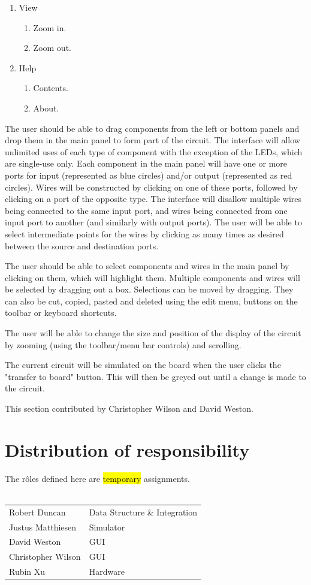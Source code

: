 \documentclass[12pt, a4paper, oneside,titlepage]{article}
\begin{document}
\begin{enumerate}
\begin{enumerate}
												 \item View
												 												\begin{enumerate}
												\item Zoom in.
												\item Zoom out.
												\end{enumerate}	
												
												 \item Help
												 												\begin{enumerate}
												\item Contents.
												\item About.
												\end{enumerate}	
												\end{enumerate}

\end{enumerate}
The user should be able to drag components from the left or bottom panels and drop them in the main panel to form part of the circuit. The interface will allow unlimited uses of each type of component with the exception of the LEDs, which are single-use only. Each component in the main panel will have one or more ports for input (represented as blue circles) and/or output (represented as red circles). Wires will be constructed by clicking on one of these ports, followed by clicking on a port of the opposite type. The interface will disallow multiple wires being connected to the same input port, and wires being connected from one input port to another (and similarly with output ports). The user will be able to select intermediate points for the wires by clicking as many times as desired between the source and destination ports.


The user should be able to select components and wires in the main panel by clicking on them, which will highlight them. Multiple components and wires will be selected by dragging out a box. Selections can be moved by dragging. They can also be cut, copied, pasted and deleted using the edit menu, buttons on the toolbar or keyboard shortcuts.

The user will be able to change the size and position of the display of the circuit by zooming (using the toolbar/menu bar controls) and scrolling.

The current circuit will be simulated on the board when the user clicks the "transfer to board" button. This will then be greyed out until a change is made to the circuit.

This section contributed by Christopher Wilson and David Weston.

\section{Distribution of responsibility}
The r\^oles defined here are \hl{temporary} assignments. \\ \\ 
\begin{tabular}{l l}
Robert Duncan & Data Structure \& Integration\\ 
Justus Matthiesen & Simulator \\
David Weston & GUI \\
Christopher Wilson & GUI \\
Rubin Xu & Hardware \\
\end{tabular}
\end{document}
